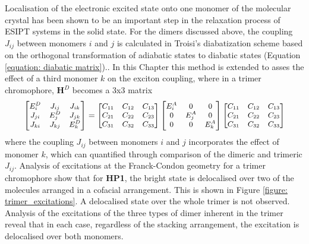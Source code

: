 Localisation of the electronic excited state onto one monomer of the molecular crystal has been shown to be an important step in the relaxation process of ESIPT systems in the solid state. For the dimers discussed above, the coupling $J_{ij}$ between monomers $i$ and $j$ is calculated in Troisi's diabatization scheme based on the orthogonal transformation of adiabatic states to diabatic states (Equation \ref{equation: diabatic matrix}).\cite{Arago2015,Fornari2016}. In this Chapter this method is extended to asses the effect of a third monomer $k$ on the exciton coupling, where in a trimer chromophore, $\textbf{H}^D$ becomes a 3x3 matrix
\begin{equation}
\small
\label{equation: 3x3 diabatic matrix}
\begin{bmatrix}
E_{i}^D & J_{ij} & J_{ik}\\
J_{ji} & E_{j}^D & J_{jk} \\
J_{ki} & J_{kj}& E_{k}^D
\end{bmatrix}
=
\begin{bmatrix}
C_{11} & C_{12} & C_{13}\\
C_{21} & C_{22} & C_{23}\\
C_{31} & C_{32} & C_{33}
\end{bmatrix}
\begin{bmatrix}
E_{i}^A & 0 & 0\\
0 & E_{j}^A & 0\\
0 & 0 & E_{k}^A\\
\end{bmatrix}
\begin{bmatrix}
C_{11} & C_{12} & C_{13}\\
C_{21} & C_{22} & C_{23}\\
C_{31} & C_{32} & C_{33}
\end{bmatrix}
\end{equation} 
where the coupling $J_{ij}$ between monomers $i$ and $j$ incorporates the effect of monomer $k$, which can quantified through comparison of the dimeric and trimeric $J_{ij}$. Analysis of excitations at the Franck-Condon geometry for a trimer chromophore show that for \textbf{HP1}, the bright state is delocalised over two of the molecules arranged in a cofacial arrangement. This is shown in Figure \ref{figure: trimer_excitations}. A delocalised state over the whole trimer is not observed. Analysis of the excitations of the three types of dimer inherent in the trimer reveal that in each case, regardless of the stacking arrangement, the excitation is delocalised over both monomers. 

